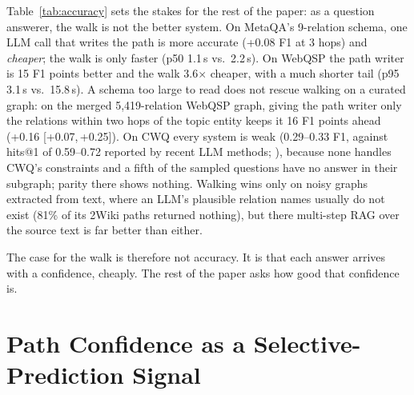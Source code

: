 \documentclass[11pt]{article}
\newcommand{\ci}[2]{{\scriptsize[#1,\,#2]}}
\begin{document}
Table~\ref{tab:accuracy} sets the stakes for the rest of the paper: as a question
answerer, the walk is not the better system. On MetaQA's 9-relation schema, one LLM call
that writes the path is more accurate (+0.08 F1 at 3 hops) and \emph{cheaper}; the walk
is only faster (p50 1.1\,s vs.\ 2.2\,s). On WebQSP the path writer is 15 F1 points
better and the walk 3.6$\times$ cheaper, with a much shorter tail (p95 3.1\,s vs.\
15.8\,s). A schema too large to read does not rescue walking on a curated graph: on the
merged 5,419-relation WebQSP graph, giving the path writer only the relations within two
hops of the topic entity keeps it 16 F1 points ahead (+0.16 \ci{+0.07}{+0.25}). On CWQ
every system is weak (0.29--0.33 F1, against hits@1 of 0.59--0.72 reported by
recent LLM methods; \citealp{sun2024tog,jiang2025kgagent}), because
none handles CWQ's constraints and a fifth of the sampled questions have no answer in
their subgraph; parity there shows nothing. Walking wins only on noisy graphs extracted
from text, where an LLM's plausible relation names usually do not exist (81\% of its
2Wiki paths returned nothing), but there multi-step RAG over the source text is far
better than either.

The case for the walk is therefore not accuracy. It is that each answer arrives with a
confidence, cheaply. The rest of the paper asks how good that confidence is.

\section{Path Confidence as a Selective-Prediction Signal}
\label{sec:selective}
\end{document}
